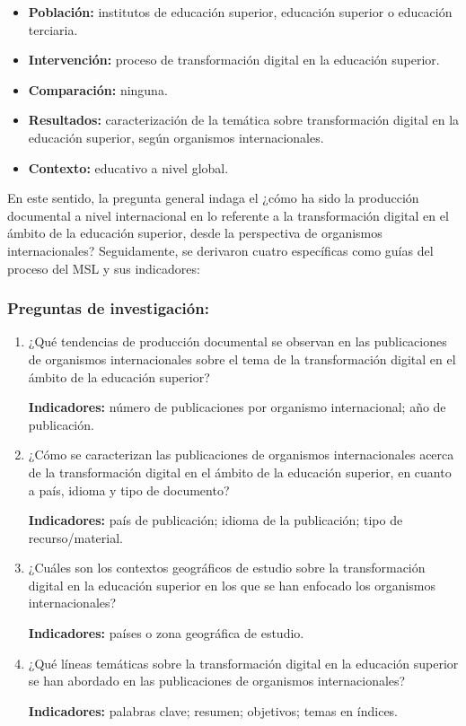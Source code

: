 \begin{itemize}
\item
\textbf{Población:} institutos de educación superior, educación
superior o educación terciaria.
\item
\textbf{Intervención:} proceso de transformación digital en la
educación superior.
\item
\textbf{Comparación:} ninguna.
\item
\textbf{Resultados:} caracterización de la temática sobre
transformación digital en la educación superior, según organismos
internacionales.
\item
\textbf{Contexto:} educativo a nivel global.
\end{itemize}

En este sentido, la pregunta general indaga el ¿cómo ha sido la
producción documental a nivel internacional en lo referente a la
transformación digital en el ámbito de la educación superior, desde la
perspectiva de organismos internacionales? Seguidamente, se derivaron
cuatro específicas como guías del proceso del MSL y sus indicadores:

\subsubsection{Preguntas de investigación:}\label{sub-sub-sec-preguntas-de-investigacion}

\begin{enumerate}[label=\textbf{PI\arabic*}]

\item ¿Qué tendencias de producción documental se observan en las
publicaciones de organismos internacionales sobre el tema de la
transformación digital en el ámbito de la educación superior?

\textbf{Indicadores:} número de publicaciones por organismo
internacional; año de publicación.

\item ¿Cómo se caracterizan las publicaciones de organismos
internacionales acerca de la transformación digital en el ámbito de la
educación superior, en cuanto a país, idioma y tipo de documento?

\textbf{Indicadores:} país de publicación; idioma de la publicación;
tipo de recurso/material.

\item ¿Cuáles son los contextos geográficos de estudio sobre la
transformación digital en la educación superior en los que se han
enfocado los organismos internacionales?

\textbf{Indicadores:} países o zona geográfica de estudio.

\item ¿Qué líneas temáticas sobre la transformación digital en la
educación superior se han abordado en las publicaciones de organismos
internacionales?

\textbf{Indicadores:} palabras clave; resumen; objetivos; temas en
índices.

\end{enumerate}
    
